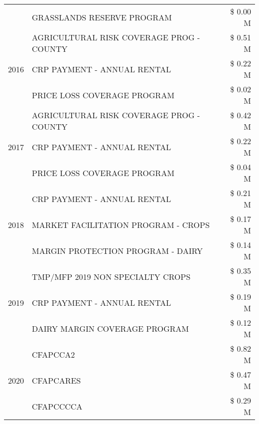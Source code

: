 \begin{tabular}{llr}
 & GRASSLANDS RESERVE PROGRAM & \$ 0.00 M \\
\cline{1-3}
\multirow[t]{3}{*}{2016} & AGRICULTURAL RISK COVERAGE PROG - COUNTY & \$ 0.51 M \\
 & CRP PAYMENT - ANNUAL RENTAL & \$ 0.22 M \\
 & PRICE LOSS COVERAGE PROGRAM & \$ 0.02 M \\
\cline{1-3}
\multirow[t]{3}{*}{2017} & AGRICULTURAL RISK COVERAGE PROG - COUNTY & \$ 0.42 M \\
 & CRP PAYMENT - ANNUAL RENTAL & \$ 0.22 M \\
 & PRICE LOSS COVERAGE PROGRAM & \$ 0.04 M \\
\cline{1-3}
\multirow[t]{3}{*}{2018} & CRP PAYMENT - ANNUAL RENTAL & \$ 0.21 M \\
 & MARKET FACILITATION PROGRAM - CROPS & \$ 0.17 M \\
 & MARGIN PROTECTION PROGRAM - DAIRY & \$ 0.14 M \\
\cline{1-3}
\multirow[t]{3}{*}{2019} & TMP/MFP 2019 NON SPECIALTY CROPS & \$ 0.35 M \\
 & CRP PAYMENT - ANNUAL RENTAL & \$ 0.19 M \\
 & DAIRY MARGIN COVERAGE PROGRAM & \$ 0.12 M \\
\cline{1-3}
\multirow[t]{3}{*}{2020} & CFAPCCA2 & \$ 0.82 M \\
 & CFAPCARES & \$ 0.47 M \\
 & CFAPCCCCA & \$ 0.29 M \\
\cline{1-3}
\bottomrule
\end{tabular}
